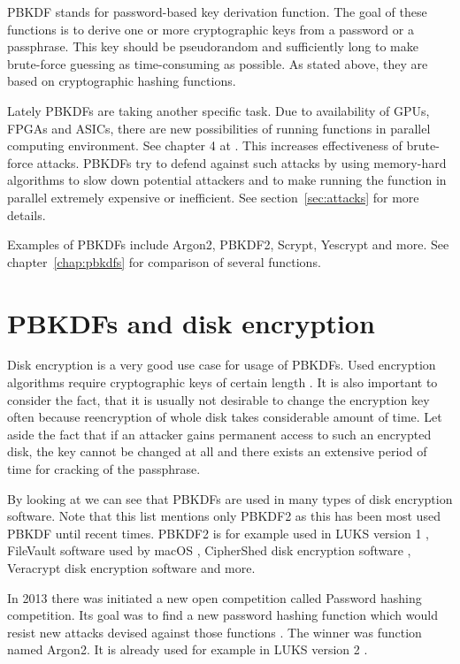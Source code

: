 \documentclass[nolof]{fithesis3}
\begin{document}
PBKDF stands for password-based key derivation function. The goal of these functions is to derive one or more cryptographic keys from a password or a passphrase. This key should be pseudorandom and sufficiently long to make brute-force guessing as time-consuming as possible. As stated above, they are based on cryptographic hashing functions.

Lately PBKDFs are taking another specific task. Due to availability of GPUs, FPGAs and ASICs, there are new possibilities of running functions in parallel computing environment. See chapter 4 at \parencite{mosnacek}. This increases effectiveness of brute-force attacks. PBKDFs try to defend against such attacks by using memory-hard algorithms to slow down potential attackers and to make running the function in parallel extremely expensive or inefficient. See section~\ref{sec:attacks} for more details.

Examples of PBKDFs include Argon2, PBKDF2, Scrypt, Yescrypt and more. See chapter~\ref{chap:pbkdfs} for comparison of several functions.

\section{PBKDFs and disk encryption}
Disk encryption is a very good use case for usage of PBKDFs. Used encryption algorithms require cryptographic keys of certain length \parencite{veracrypt}. It is also important to consider the fact, that it is usually not desirable to change the encryption key often because reencryption of whole disk takes considerable amount of time. Let aside the fact that if an attacker gains permanent access to such an encrypted disk, the key cannot be changed at all and there exists an extensive period of time for cracking of the passphrase.

By looking at \parencite{pbkdf2usage} we can see that PBKDFs are used in many types of disk encryption software. Note that this list mentions only PBKDF2 as this has been most used PBKDF until recent times. PBKDF2 is for example used in LUKS version 1 \parencite{luks1}, FileVault software used by macOS \parencite{filevault}, CipherShed disk encryption software \parencite{ciphershed}, Veracrypt disk encryption software \parencite{veracrypt} and more.

In 2013 there was initiated a new open competition called Password hashing competition. Its goal was to find a new password hashing function which would resist new attacks devised against those functions \parencite{phc}. The winner was function named Argon2. It is already used for example in LUKS version 2 \parencite{luks2}.
\end{document}
